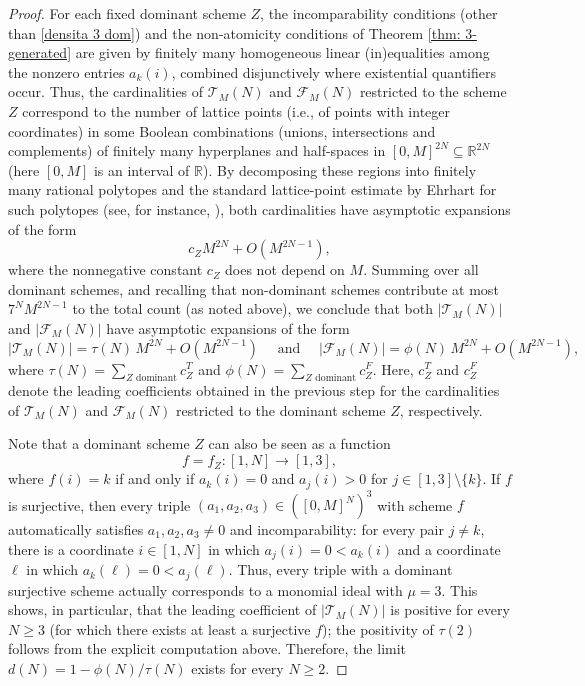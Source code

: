 \documentclass[a4paper,10pt,reqno]{amsart}
\theoremstyle{definition}
\theoremstyle{definition}
\begin{document}
\begin{proof}
For each fixed dominant scheme $Z$, the incomparability conditions (other than \eqref{densita 3 dom}) and the non-atomicity conditions of Theorem \ref{thm: 3-generated} are given by finitely many homogeneous linear (in)equalities among the nonzero entries $a_k(i)$, combined disjunctively where existential quantifiers occur. Thus, the cardinalities of $\mathcal T_M(N)$ and $\mathcal F_M(N)$ restricted to the scheme $Z$ correspond to the number of lattice points (i.e., of points with integer coordinates) in some Boolean combinations (unions, intersections and complements) of finitely many hyperplanes and half-spaces in $[0,M]^{2N}\subseteq \mathbb R^{2N}$ (here $[0,M]$ is an interval of $\mathbb R$). By decomposing these regions into finitely many rational polytopes and the standard lattice-point estimate by Ehrhart for such polytopes (see, for instance, \cite[Theorem 3.23, Exercise 3.34]{Be-Ro}), both cardinalities have asymptotic expansions of the form
\[ c_Z M^{2N}+O(M^{2N-1}),\]
where the nonnegative constant $c_Z$ does not depend on $M$. Summing over all dominant schemes, and recalling that non-dominant schemes contribute at most $7^NM^{2N-1}$ to the total count (as noted above), we conclude that both $|\mathcal T_M(N)|$ and $|\mathcal F_M(N)|$ have asymptotic expansions of the form
$$|\mathcal T_M(N)|=\tau(N)\,M^{2N}+O(M^{2N-1})\quad \text{ and }\quad |\mathcal F_M(N)|=\phi(N)\,M^{2N}+O(M^{2N-1}),$$
where $\tau(N)=\sum_{Z\text{ dominant}}c_Z^T$ and $\phi(N)=\sum_{Z\text{ dominant}}c_Z^F$. Here, $c_Z^T$ and $c_Z^F$ denote the leading coefficients obtained in the previous step for the cardinalities of $\mathcal T_M(N)$ and $\mathcal F_M(N)$ restricted to the dominant scheme $Z$, respectively.
 
Note that a dominant scheme $Z$ can also be seen as a function
\[ f=f_Z:[1,N]\to[1,3],\]
where $f(i)=k$ if and only if $a_k(i)=0$ and $a_j(i)>0$ for $j\in [1,3]\setminus\{k\}$. If $f$ is surjective, then every triple $(a_1,a_2,a_3)\in([0,M]^N)^3$ with scheme $f$ automatically satisfies $a_1,a_2,a_3\neq 0$ and incomparability: for every pair $j\ne k$, there is a coordinate $i\in [1,N]$ in which $a_j(i)=0<a_k(i)$ and a coordinate $\ell$ in which $a_k(\ell)=0<a_j(\ell)$. Thus, every triple with a dominant surjective scheme actually corresponds to a monomial ideal with $\mu=3$. This shows, in particular, that the leading coefficient of $|\mathcal T_M(N)|$ is positive for every $N\ge 3$ (for which there exists at least a surjective $f$); the positivity of $\tau(2)$ follows from the explicit computation above. Therefore, the limit $d(N)=1-\phi(N)/\tau(N)$ exists for every $N\ge 2$.


\end{proof}
\end{document}
